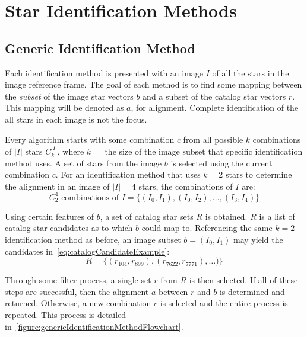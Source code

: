 \section{Star Identification Methods}\label{sec:starIdentificationMethods}

\subsection{Generic Identification Method}\label{subsec:genericIdentificationMethod}
Each identification method is presented with an image $I$ of all the stars in the image reference frame. The goal of
each method is to find some mapping between the \textit{subset} of the image star vectors $b$ and a subset of the
catalog star vectors $r$. This mapping will be denoted as $a$, for alignment. Complete identification of the all stars
in each image is not the focus.

Every algorithm starts with some combination $c$ from all possible $k$ combinations of $|I|$ stars $C_k^{|I|}$, where
$k = $ the size of the image subset that specific identification method uses. A set of stars from the image $b$ is
selected using the current combination $c$. For an identification method that uses $k=2$ stars to determine the
alignment in an image of $|I|=4$ stars, the combinations of $I$ are:
\begin{equation}
    C_2^4 \text{ combinations of } I = \{(I_0, I_1), (I_0, I_2), \ldots, (I_3, I_4)\}
\end{equation}

Using certain features of $b$, a set of catalog star sets $R$ is obtained. $R$ is a list of catalog star candidates as
to which $b$ could map to. Referencing the same $k=2$ identification method as before, an image subset $b = (I_0, I_1)$
may yield the candidates in~\autoref{eq:catalogCandidateExample}:
\begin{equation}
    \label{eq:catalogCandidateExample}
    R = \{ (r_{104}, r_{899}), (r_{7622}, r_{7771}), \ldots) \}
\end{equation}

Through some filter process, a single set $r$ from $R$ is then selected. If all of these steps are successful, then the
alignment $a$ between $r$ and $b$ is determined and returned. Otherwise, a new combination $c$ is selected and the
entire process is repeated. This process is detailed
in~\autoref{figure:genericIdentificationMethodFlowchart}.

\begin{figure}
\end{figure}

